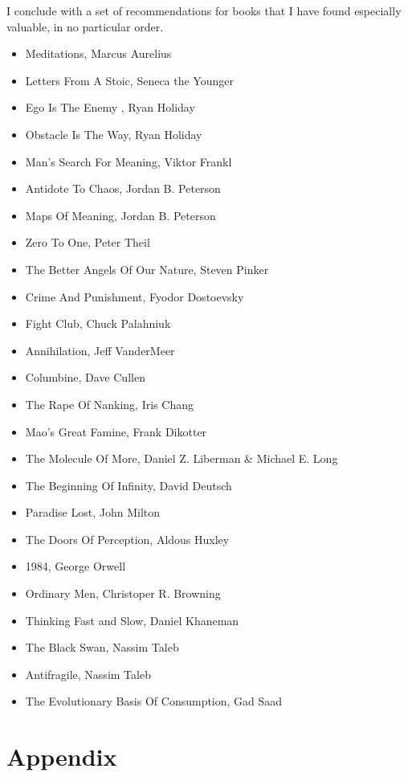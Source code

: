 \documentclass[10pt,twocolumn]{extarticle}
\begin{document}
I conclude with a set of recommendations for books that I have found especially valuable, in no particular order.

\begin{itemize}
    \item Meditations, Marcus Aurelius
    \item Letters From A Stoic, Seneca the Younger
    \item Ego Is The Enemy , Ryan Holiday
    \item Obstacle Is The Way, Ryan Holiday
    \item Man's Search For Meaning, Viktor Frankl
    \item Antidote To Chaos, Jordan B. Peterson
    \item Maps Of Meaning, Jordan B. Peterson
    \item Zero To One, Peter Theil
    \item The Better Angels Of Our Nature, Steven Pinker
    \item Crime And Punishment, Fyodor Dostoevsky
    \item Fight Club, Chuck Palahniuk
    \item Annihilation, Jeff VanderMeer 
    \item Columbine, Dave Cullen
    \item The Rape Of Nanking, Iris Chang
    \item Mao's Great Famine, Frank Dikotter
    \item The Molecule Of More, Daniel Z. Liberman \& Michael E. Long
    \item The Beginning Of Infinity, David Deutsch
    \item Paradise Lost, John Milton
    \item The Doors Of Perception, Aldous Huxley
    \item 1984, George Orwell
    \item Ordinary Men, Christoper R. Browning
    \item Thinking Fast and Slow, Daniel Khaneman
    \item The Black Swan, Nassim Taleb
    \item Antifragile, Nassim Taleb
    \item The Evolutionary Basis Of Consumption, Gad Saad
\end{itemize}

\section{Appendix}
\end{document}

